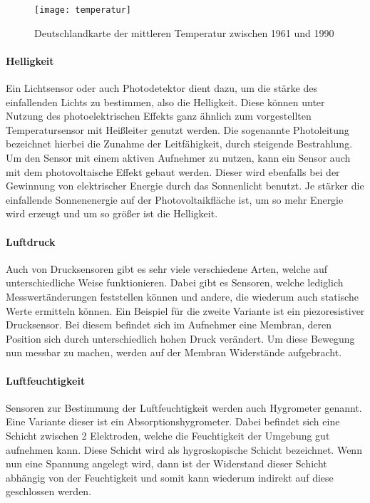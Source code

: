 \begin{figure}[htbp]
\centering
\caption{Deutschlandkarte der mittleren Temperatur zwischen 1961 und 1990}
\label{fig:temperatur}
\texttt{[image: temperatur]}
\end{figure}

\paragraph{Helligkeit}

Ein Lichtsensor oder auch Photodetektor dient dazu, um die stärke des einfallenden Lichts zu bestimmen, also die Helligkeit. Diese können unter Nutzung des photoelektrischen Effekts ganz ähnlich zum vorgestellten Temperatursensor mit Heißleiter genutzt werden. Die sogenannte Photoleitung bezeichnet hierbei die Zunahme der Leitfähigkeit, durch steigende Bestrahlung. Um den Sensor mit einem aktiven Aufnehmer zu nutzen, kann ein Sensor auch mit dem photovoltaische Effekt gebaut werden. Dieser wird ebenfalls bei der Gewinnung von elektrischer Energie durch das Sonnenlicht benutzt. Je stärker die einfallende Sonnenenergie auf der Photovoltaikfläche ist, um so mehr Energie wird erzeugt und um so größer ist die Helligkeit.

\paragraph{Luftdruck}

Auch von Drucksensoren gibt es sehr viele verschiedene Arten, welche auf unterschiedliche Weise funktionieren. Dabei gibt es Sensoren, welche lediglich Messwertänderungen feststellen können und andere, die wiederum auch statische Werte ermitteln können. Ein Beispiel für die zweite Variante ist ein piezoresistiver Drucksensor. Bei diesem befindet sich im Aufnehmer eine Membran, deren Position sich durch unterschiedlich hohen Druck verändert. Um diese Bewegung nun messbar zu machen, werden auf der Membran Widerstände aufgebracht.

\paragraph{Luftfeuchtigkeit}

Sensoren zur Bestimmung der Luftfeuchtigkeit werden auch Hygrometer genannt. Eine Variante dieser ist ein Absorptionshygrometer. Dabei befindet sich eine Schicht zwischen 2 Elektroden, welche die Feuchtigkeit der Umgebung gut aufnehmen kann. Diese Schicht wird als hygroskopische Schicht bezeichnet. Wenn nun eine Spannung angelegt wird, dann ist der Widerstand dieser Schicht abhängig von der Feuchtigkeit und somit kann wiederum indirekt auf diese geschlossen werden.

